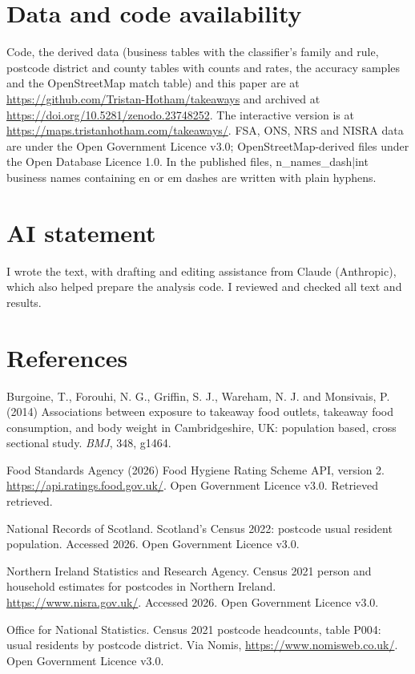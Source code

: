 \documentclass[11pt,a4paper]{article}
\begin{document}
\section*{Data and code availability}

Code, the derived data (business tables with the classifier's family and rule, postcode district and county tables with counts and rates, the accuracy samples and the OpenStreetMap match table) and this paper are at \url{https://github.com/Tristan-Hotham/takeaways} and archived at \url{https://doi.org/10.5281/zenodo.23748252}. The interactive version is at \url{https://maps.tristanhotham.com/takeaways/}. FSA, ONS, NRS and NISRA data are under the Open Government Licence v3.0; OpenStreetMap-derived files under the Open Database Licence 1.0. In the published files, {{n_names_dash|int}} business names containing en or em dashes are written with plain hyphens.

\section*{AI statement}

I wrote the text, with drafting and editing assistance from Claude (Anthropic), which also helped prepare the analysis code. I reviewed and checked all text and results.

\section*{References}
\begingroup\small
\setlength{\parskip}{0.3em}

Burgoine, T., Forouhi, N. G., Griffin, S. J., Wareham, N. J. and Monsivais, P. (2014) Associations between exposure to takeaway food outlets, takeaway food consumption, and body weight in Cambridgeshire, UK: population based, cross sectional study. \textit{BMJ}, 348, g1464.

Food Standards Agency (2026) Food Hygiene Rating Scheme API, version 2. \url{https://api.ratings.food.gov.uk/}. Open Government Licence v3.0. Retrieved {{retrieved}}.

National Records of Scotland. Scotland's Census 2022: postcode usual resident population. Accessed 2026. Open Government Licence v3.0.

Northern Ireland Statistics and Research Agency. Census 2021 person and household estimates for postcodes in Northern Ireland. \url{https://www.nisra.gov.uk/}. Accessed 2026. Open Government Licence v3.0.

Office for National Statistics. Census 2021 postcode headcounts, table P004: usual residents by postcode district. Via Nomis, \url{https://www.nomisweb.co.uk/}. Open Government Licence v3.0.
\end{document}
